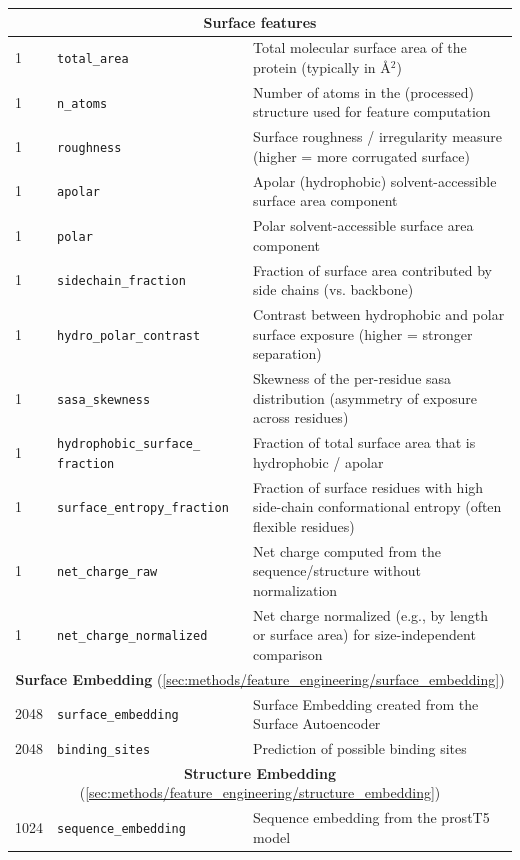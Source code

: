 \begin{longtable}{|p{1.5cm}||p{5cm}|p{8cm}|}
\hline
\hline
\multicolumn{3}{c}{\textbf{Surface features}} \\[4pt]
\hline
1 & \texttt{total\_area} & Total molecular surface area of the protein (typically in \AA$^2$) \\
\hline
1 & \texttt{n\_atoms} & Number of atoms in the (processed) structure used for feature computation \\
\hline
1 & \texttt{roughness} & Surface roughness / irregularity measure (higher = more corrugated surface) \\
\hline
1 & \texttt{apolar} & Apolar (hydrophobic) solvent-accessible surface area component \\
\hline
1 & \texttt{polar} & Polar solvent-accessible surface area component \\
\hline
1 & \texttt{sidechain\_fraction} & Fraction of surface area contributed by side chains (vs. backbone) \\
\hline
1 & \texttt{hydro\_polar\_contrast} & Contrast between hydrophobic and polar surface exposure (higher = stronger separation) \\
\hline
1 & \texttt{sasa\_skewness} & Skewness of the per-residue \gls{sasa} distribution (asymmetry of exposure across residues) \\
\hline
1 & \texttt{hydrophobic\_surface\_ fraction} & Fraction of total surface area that is hydrophobic / apolar \\
\hline
1 & \texttt{surface\_entropy\_fraction} & Fraction of surface residues with high side-chain conformational entropy (often flexible residues) \\
\hline
1 & \texttt{net\_charge\_raw} & Net charge computed from the sequence/structure without normalization \\
\hline
1 & \texttt{net\_charge\_normalized} & Net charge normalized (e.g., by length or surface area) for size-independent comparison \\
\hline
\hline
\multicolumn{3}{c}{\textbf{Surface Embedding} (\ref{sec:methods/feature_engineering/surface_embedding})} \\[4pt]
\hline
2048 &\texttt{surface\_embedding} & Surface Embedding created from the Surface Autoencoder \\ \hline
2048 &\texttt{binding\_sites} & Prediction of possible binding sites \\[4pt]
\hline
\hline
\multicolumn{3}{c}{\textbf{Structure Embedding} (\ref{sec:methods/feature_engineering/structure_embedding})} \\[4pt]
\hline
1024 &\texttt{sequence\_embedding} & Sequence embedding from the \gls{prostT5} model \\ \hline

\end{longtable}
